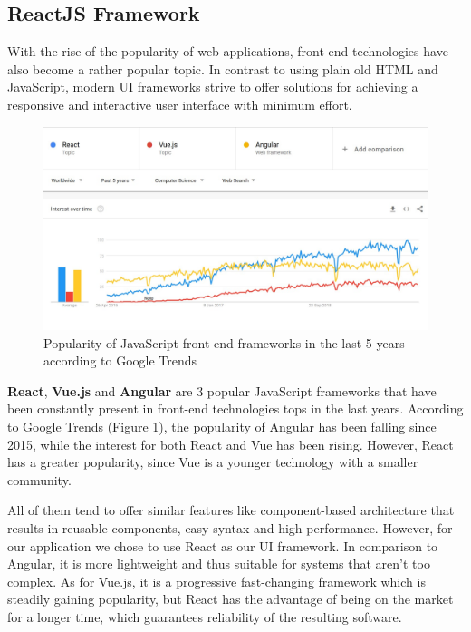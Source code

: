 \subsection{ReactJS Framework}
\label{section:reactJSFramework}

With the rise of the popularity of web applications, front-end technologies have also become a rather popular topic. In contrast to using plain old HTML and JavaScript, modern UI frameworks strive to offer solutions for achieving a responsive and interactive user interface with minimum effort.

\begin{figure}[H]
  \centering
  \includegraphics[width=6.5in]{images/jsWebFrameworksTrends}
  \caption{Popularity of JavaScript front-end frameworks in the last 5 years according to Google Trends}
  \label{jsWebFrameworksTrends}
\end{figure}

\textbf{React}, \textbf{Vue.js} and \textbf{Angular} are 3 popular JavaScript frameworks that have been constantly present in front-end technologies tops in the last years. According to Google Trends (Figure \ref{jsWebFrameworksTrends}), the popularity of Angular has been falling since 2015, while the interest for both React and Vue has been rising. However, React has a greater popularity, since Vue is a younger technology with a smaller community.

All of them tend to offer similar features like component-based architecture that results in reusable components, easy syntax and high performance. However, for our application we chose to use React as our UI framework. In comparison to Angular, it is more lightweight and thus suitable for systems that aren't too complex. As for Vue.js, it is a progressive fast-changing framework which is steadily gaining popularity, but React has the advantage of being on the market for a longer time, which guarantees reliability of the resulting software.


